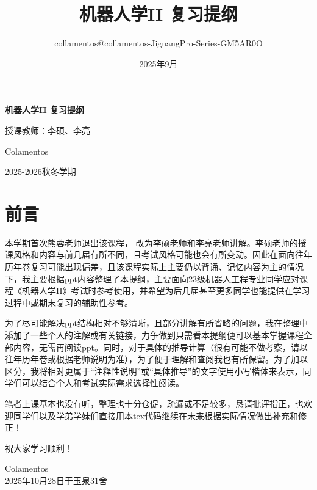 \documentclass[a4paper,11pt]{article}
\title{机器人学II 复习提纲 \\ \vspace{0.5cm} \large }
\author{collamentos@collamentos-JiguangPro-Series-GM5AR0O}
\date{2025年9月}
\begin{document}
\begin{titlepage}
    \centering
    \vspace*{3cm}
    {\Huge \textbf{机器人学II 复习提纲} \par}
    \vspace{0.5cm}
    {\Large 授课教师：李硕、李亮\par}
    \vspace{3cm}
    {\Large Colamentos \par}
    {\Large 2025-2026秋冬学期 \par}
\end{titlepage}

\section*{前言}

本学期首次熊蓉老师退出该课程， 改为李硕老师和李亮老师讲解。李硕老师的授课风格和内容与前几届有所不同，且考试风格可能也会有所变动。因此在面向往年历年卷复习可能出现偏差，且该课程实际上主要仍以背诵、记忆内容为主的情况下，我主要根据ppt内容整理了本提纲，主要面向23级机器人工程专业同学应对课程《机器人学II》考试时参考使用，并希望为后几届甚至更多同学也能提供在学习过程中或期末复习的辅助性参考。

为了尽可能解决ppt结构相对不够清晰，且部分讲解有所省略的问题，我在整理中添加了一些个人的注解或有关链接，力争做到只需看本提纲便可以基本掌握课程全部内容，无需再阅读ppt。同时，对于具体的推导计算（很有可能不做考察，请以往年历年卷或根据老师说明为准），为了便于理解和查阅我也有所保留。为了加以区分，我将相对更属于“注释性说明”或“具体推导”的文字使用小写楷体来表示，同学们可以结合个人和考试实际需求选择性阅读。

笔者上课基本也没有听，整理也十分仓促，疏漏或不足较多，恳请批评指正，也欢迎同学们以及学弟学妹们直接用本tex代码继续在未来根据实际情况做出补充和修正！

祝大家学习顺利！

\begin{flushright}
Colamentos\\
2025年10月28日于玉泉31舍
\end{flushright}
\newpage
\tableofcontents
\thispagestyle{empty}
\newpage









\end{document}
